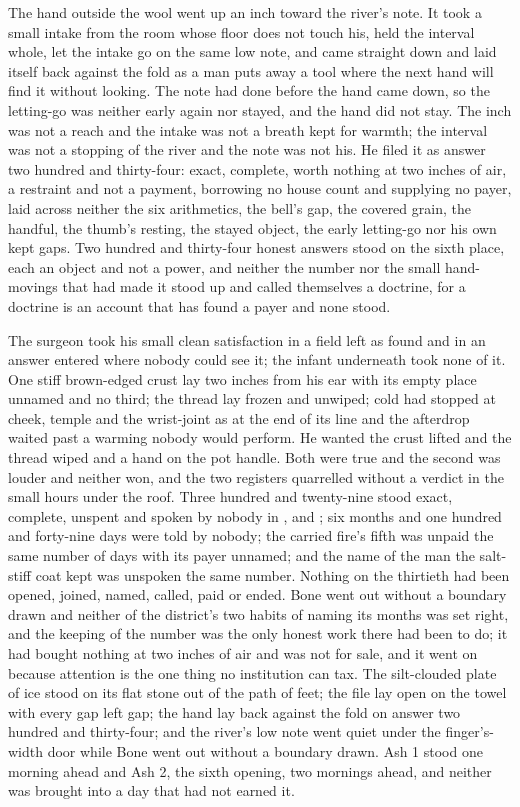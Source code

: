 The hand outside the wool went up an inch toward the river's note. It took a small intake from the room whose floor does not touch his, held the interval whole, let the intake go on the same low note, and came straight down and laid itself back against the fold as a man puts away a tool where the next hand will find it without looking. The note had done before the hand came down, so the letting-go was neither early again nor stayed, and the hand did not stay. The inch was not a reach and the intake was not a breath kept for warmth; the interval was not a stopping of the river and the note was not his. He filed it as answer two hundred and thirty-four: exact, complete, worth nothing at two inches of air, a restraint and not a payment, borrowing no house count and supplying no payer, laid across neither the six arithmetics, the bell's gap, the covered grain, the handful, the thumb's resting, the stayed object, the early letting-go nor his own kept gaps. Two hundred and thirty-four honest answers stood on the sixth place, each an object and not a power, and neither the number nor the small hand-movings that had made it stood up and called themselves a doctrine, for a doctrine is an account that has found a payer and none stood.

The surgeon took his small clean satisfaction in a field left as found and in an answer entered where nobody could see it; the infant underneath took none of it. One stiff brown-edged crust lay two inches from his ear with its empty place unnamed and no third; the thread lay frozen and unwiped; cold had stopped at cheek, temple and the wrist-joint as at the end of its line and the afterdrop waited past a warming nobody would perform. He wanted the crust lifted and the thread wiped and a hand on the pot handle. Both were true and the second was louder and neither won, and the two registers quarrelled without a verdict in the small hours under the roof. Three hundred and twenty-nine stood exact, complete, unspent and spoken by nobody in ,  and ; six months and one hundred and forty-nine days were told by nobody; the carried fire's fifth was unpaid the same number of days with its payer unnamed; and the name of the man the salt-stiff coat kept was unspoken the same number. Nothing on the thirtieth had been opened, joined, named, called, paid or ended. Bone went out without a boundary drawn and neither of the district's two habits of naming its months was set right, and the keeping of the number was the only honest work there had been to do; it had bought nothing at two inches of air and was not for sale, and it went on because attention is the one thing no institution can tax. The silt-clouded plate of ice stood on its flat stone out of the path of feet; the file lay open on the towel with every gap left gap; the hand lay back against the fold on answer two hundred and thirty-four; and the river's low note went quiet under the finger's-width door while Bone went out without a boundary drawn. Ash 1 stood one morning ahead and Ash 2, the sixth opening, two mornings ahead, and neither was brought into a day that had not earned it.
